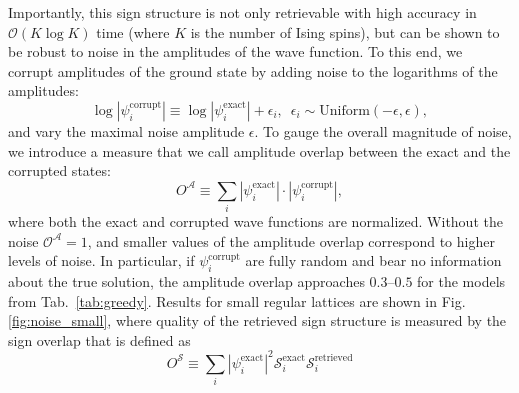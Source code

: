Importantly, this sign structure is not only retrievable with high accuracy in $\mathcal{O}(K \log K)$ time (where $K$ is the number of Ising spins), but can be shown to be robust to noise in the amplitudes of the wave function. To this end, we corrupt amplitudes of the ground state by adding noise to the logarithms of the amplitudes:
\begin{equation}
    \log \left|\psi^\mathrm{corrupt}_i\right| \equiv \log \left|\psi^\mathrm{exact}_i\right| + \epsilon_i, \,\,\, \epsilon_i \sim \mbox{Uniform}(-\epsilon, \epsilon ), 
\end{equation}
and vary the maximal noise amplitude $\epsilon$. To gauge the overall magnitude of noise, we introduce a measure that we call amplitude overlap between the exact and the corrupted states:
\begin{equation}
    O^\mathcal{A} \equiv \sum_i |\psi^\mathrm{exact}_i|\cdot |\psi^\mathrm{corrupt}_i|,
\end{equation}
where both the exact and corrupted wave functions are normalized. Without the noise $\mathcal{O}^\mathcal{A} = 1$, and smaller values of the amplitude overlap correspond to higher levels of noise. In particular, if $\psi^\mathrm{corrupt}_i$ are fully random and bear no information about the true solution, the amplitude overlap approaches $0.3$--$0.5$ for the models from Tab.~\ref{tab:greedy}. Results for small regular lattices are shown in Fig. \ref{fig:noise_small}, where quality of the retrieved sign structure is measured by the sign overlap that is defined as
\begin{equation}
    O^\mathcal{S} \equiv  \sum_i |\psi^\mathrm{exact}_i|^2 \mathcal{S}_i^\mathrm{exact}\mathcal{S}_i^\mathrm{retrieved}
\end{equation}



